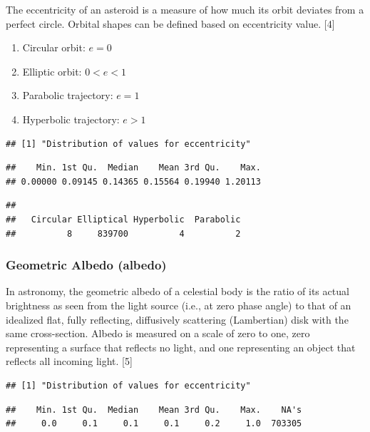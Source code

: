 \documentclass[
]{article}
\begin{document}
The eccentricity of an asteroid is a measure of how much its orbit
deviates from a perfect circle. Orbital shapes can be defined based on
eccentricity value. {[}4{]}

\begin{enumerate}
\def\labelenumi{\arabic{enumi}.}
\item
  Circular orbit: \(e=0\)
\item
  Elliptic orbit: \(0 < e < 1\)
\item
  Parabolic trajectory: \(e = 1\)
\item
  Hyperbolic trajectory: \(e > 1\)
\end{enumerate}

\begin{verbatim}
## [1] "Distribution of values for eccentricity"
\end{verbatim}

\begin{verbatim}
##    Min. 1st Qu.  Median    Mean 3rd Qu.    Max. 
## 0.00000 0.09145 0.14365 0.15564 0.19940 1.20113
\end{verbatim}

\begin{verbatim}
## 
##   Circular Elliptical Hyperbolic  Parabolic 
##          8     839700          4          2
\end{verbatim}

\hypertarget{geometric-albedo-albedo}{%
\subsubsection{Geometric Albedo
(albedo)}\label{geometric-albedo-albedo}}

In astronomy, the geometric albedo of a celestial body is the ratio of
its actual brightness as seen from the light source (i.e., at zero phase
angle) to that of an idealized flat, fully reflecting, diffusively
scattering (Lambertian) disk with the same cross-section. Albedo is
measured on a scale of zero to one, zero representing a surface that
reflects no light, and one representing an object that reflects all
incoming light. {[}5{]}

\begin{verbatim}
## [1] "Distribution of values for eccentricity"
\end{verbatim}

\begin{verbatim}
##    Min. 1st Qu.  Median    Mean 3rd Qu.    Max.    NA's 
##     0.0     0.1     0.1     0.1     0.2     1.0  703305
\end{verbatim}
\end{document}
